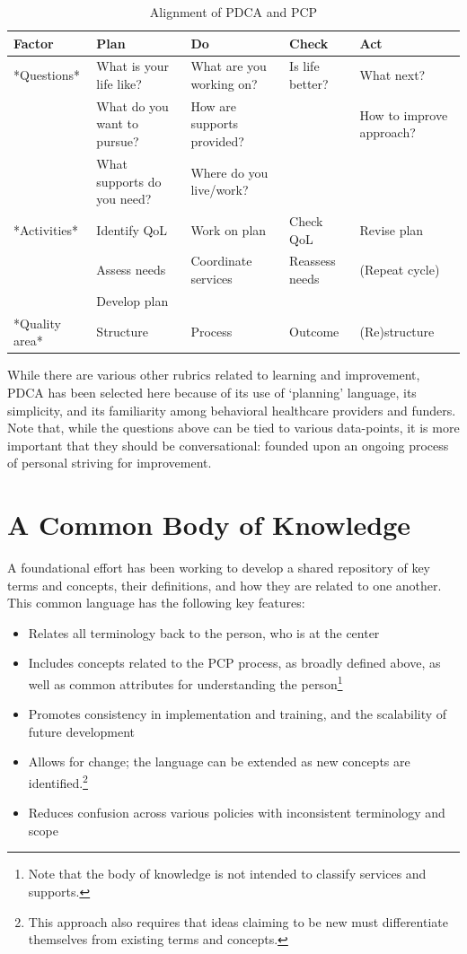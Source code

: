 \documentclass[
]{book}
\providecommand{\tightlist}{%
  \setlength{\itemsep}{0pt}\setlength{\parskip}{0pt}}
\begin{document}
\begin{table}

\caption{\label{tab:unnamed-chunk-3}Alignment of PDCA and PCP}
\centering
\begin{tabular}[t]{l|l|l|l|l}
\hline
Factor & Plan & Do & Check & Act\\
\hline
*Questions* & What is your life like? & What are you working on? & Is life better? & What next?\\
\hline
 & What do you want to pursue? & How are supports provided? &  & How to improve approach?\\
\hline
 & What supports do you need? & Where do you live/work? &  & \\
\hline
*Activities* & Identify QoL & Work on plan & Check QoL & Revise plan\\
\hline
 & Assess needs & Coordinate services & Reassess needs & (Repeat cycle)\\
\hline
 & Develop plan &  &  & \\
\hline
*Quality area* & Structure & Process & Outcome & (Re)structure\\
\hline
\end{tabular}
\end{table}

While there are various other rubrics related to learning and improvement, PDCA has been selected here because of its use of `planning' language, its simplicity, and its familiarity among behavioral healthcare providers and funders. Note that, while the questions above can be tied to various data-points, it is more important that they should be conversational: founded upon an ongoing process of personal striving for improvement.

\hypertarget{bok}{%
\chapter{A Common Body of Knowledge}\label{bok}}

A foundational effort has been working to develop a shared repository of key terms and concepts, their definitions, and how they are related to one another. This common language has the following key features:

\begin{itemize}
\tightlist
\item
  Relates all terminology back to the person, who is at the center
\item
  Includes concepts related to the PCP process, as broadly defined above, as well as common attributes for understanding the person\footnote{Note that the body of knowledge is not intended to classify services and supports.}
\item
  Promotes consistency in implementation and training, and the scalability of future development
\item
  Allows for change; the language can be extended as new concepts are identified.\footnote{This approach also requires that ideas claiming to be new must differentiate themselves from existing terms and concepts.}
\item
  Reduces confusion across various policies with inconsistent terminology and scope
\end{itemize}
\end{document}
